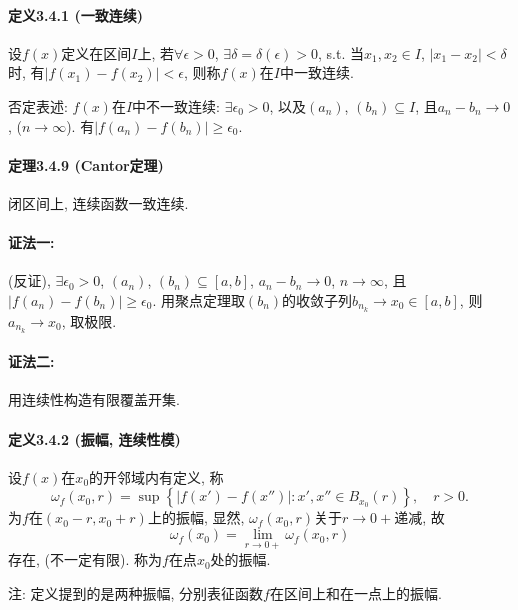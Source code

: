 \paragraph{定义3.4.1 (一致连续)}

设$f(x)$定义在区间$I$上, 若$\forall\epsilon>0$, $\exists\delta=\delta(\epsilon)>0$,
s.t. 当$x_{1},x_{2}\in I$, $\left|x_{1}-x_{2}\right|<\delta$时, 有$\left|f(x_{1})-f(x_{2})\right|<\epsilon$,
则称$f(x)$在$I$中一致连续.

否定表述: $f(x)$在$I$中不一致连续: $\exists\epsilon_{0}>0$, 以及$\left(a_{n}\right)$,
$\left(b_{n}\right)\subseteq I$, 且$a_{n}-b_{n}\to0$, ($n\to\infty$).
有$\left|f(a_{n})-f(b_{n})\right|\ge\epsilon_{0}$.

\paragraph{定理3.4.9 (Cantor定理)}

闭区间上, 连续函数一致连续.

\paragraph{证法一:}

(反证), $\exists\epsilon_{0}>0$, $\left(a_{n}\right)$, $\left(b_{n}\right)\subseteq[a,b]$,
$a_{n}-b_{n}\to0$, $n\to\infty$, 且$\left|f(a_{n})-f(b_{n})\right|\ge\epsilon_{0}$.
用聚点定理取$\left(b_{n}\right)$的收敛子列$b_{n_{k}}\to x_{0}\in[a,b]$, 则$a_{n_{k}}\to x_{0}$,
取极限.

\paragraph{证法二:}

用连续性构造有限覆盖开集.

\paragraph{定义3.4.2 (振幅, 连续性模)}

设$f(x)$在$x_{0}$的开邻域内有定义, 称
\[
\omega_{f}(x_{0},r)=\sup\left\{ \left|f(x')-f(x'')\right|:x',x''\in B_{x_{0}}(r)\right\} ,\quad r>0.
\]
为$f$在$(x_{0}-r,x_{0}+r)$上的振幅, 显然, $\omega_{f}(x_{0},r)$关于$r\to0+$递减,
故
\[
\omega_{f}(x_{0})=\lim_{r\to0+}\omega_{f}(x_{0},r)
\]
存在, (不一定有限). 称为$f$在点$x_{0}$处的振幅.

注: 定义提到的是两种振幅, 分别表征函数$f$在\textquotedbl 区间\textquotedbl 上和在\textquotedbl 一点\textquotedbl 上的振幅.

